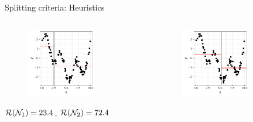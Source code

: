 \documentclass[11pt,compress,t,notes=noshow, xcolor=table]{beamer}
\begin{document}
\begin{vbframe}{Splitting criteria: Heuristics}

\begin{columns}
\begin{column}{0.5\textwidth}


\begin{figure}
\includegraphics[width=0.7\textwidth]{figure/splitcrit_optimal-constant-sub1.pdf} 
\end{figure}

$\mathcal{R}(\mathcal{N}_1) = 23.4$, $\mathcal{R}(\mathcal{N}_2) = 72.4$ 
 
\end{column}
\begin{column}{0.5\textwidth}

\begin{figure}
\includegraphics[width=0.7\textwidth]{figure/splitcrit_optimal-constant-sub2.pdf} 
\end{figure}


\end{column}
\end{columns}
\end{vbframe}
\end{document}
